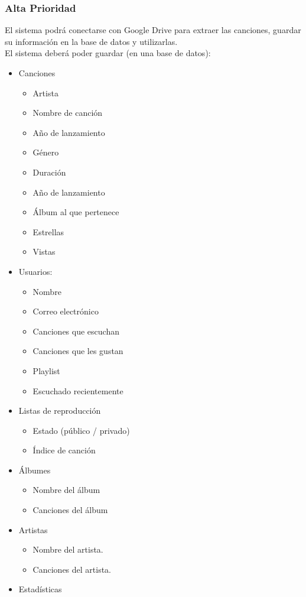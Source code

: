 \documentclass[12pt]{article}
\newcounter{ni}
\begin{document}
\subsubsection{Alta Prioridad}
El sistema podrá conectarse con Google Drive para extraer las canciones, guardar su información en la base de datos y utilizarlas. \\

El sistema deberá poder guardar (en una base de datos):
\begin{itemize}
    \item Canciones 
    \begin{itemize}
        \item Artista
        \item Nombre de canción
        \item Año de lanzamiento
        \item Género
        \item Duración
        \item Año de lanzamiento
        \item Álbum al que pertenece
        \item Estrellas
        \item Vistas
    \end{itemize}
    
    \item Usuarios:
    \begin{itemize}
        \item Nombre
        \item Correo electrónico
        \item Canciones que escuchan
        \item Canciones que les gustan
        \item Playlist
        \item Escuchado recientemente
    \end{itemize}
    
    \item Listas de reproducción
    \begin{itemize}
        \item Estado (público / privado)
        \item Índice de canción
    \end{itemize}
    
    \item Álbumes
    \begin{itemize}
        \item Nombre del álbum
        \item Canciones del álbum
    \end{itemize}

    \item Artistas
    \begin{itemize}
        \item Nombre del artista.
        \item Canciones del artista.
    \end{itemize}
    
    \item Estadísticas
\end{itemize} 
\end{document}
